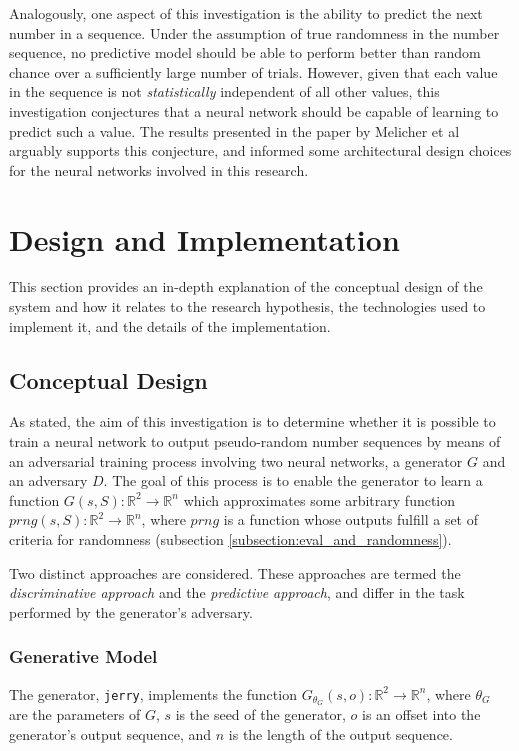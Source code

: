 \documentclass[12pt, titlepage]{report}
\theoremstyle{definition}
\begin{document}
Analogously, one aspect of this investigation is the ability to predict the next number in a sequence. Under the assumption of true randomness in the number sequence, no predictive model should be able to perform better than random chance over a sufficiently large number of trials. However, given that each value in the sequence is not \textit{statistically} independent of all other values, this investigation conjectures that a neural network should be capable of learning to predict such a value. The results presented in the paper by Melicher et al arguably supports this conjecture, and informed some architectural design choices for the neural networks involved in this research.





\chapter{Design and Implementation}\label{chapter:design}
This section provides an in-depth explanation of the conceptual design of the system and how it relates to the research hypothesis, the technologies used to implement it, and the details of the implementation.

\section{Conceptual Design}\label{section:conceptual_design}
As stated, the aim of this investigation is to determine whether it is possible to train a neural network to output pseudo-random number sequences by means of an adversarial training process involving two neural networks, a generator $G$ and an adversary $D$. The goal of this process is to enable the generator to learn a function $G(s, S) : \mathbb{R}^2 \rightarrow \mathbb{R}^n$ which approximates some arbitrary function $prng(s, S) : \mathbb{R}^2 \rightarrow \mathbb{R}^n$, where $prng$ is a function whose outputs fulfill a set of criteria for randomness (subsection \ref{subsection:eval_and_randomness}).

Two distinct approaches are considered. These approaches are termed the \textit{discriminative approach} and the \textit{predictive approach}, and differ in the task performed by the generator's adversary.



\subsection{Generative Model}
The generator, \texttt{jerry}, implements the function $G_{\theta_{G}}(s, o) : \mathbb{R}^2 \rightarrow \mathbb{R}^n$, where $\theta_G$ are the parameters of $G$, $s$ is the seed of the generator, $o$ is an offset into the generator's output sequence, and $n$ is the length of the output sequence.
\end{document}
